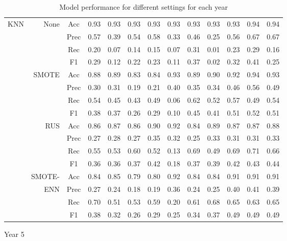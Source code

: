 \begin{table*}
\begin{narrow}{-1cm}{-1cm}
\begin{subtable}[t]{2\columnwidth}
\begin{tabular}{l|r|c|cccccccccc}
        KNN & None & Acc & 0.93 & 0.93 & 0.93 & 0.93 & 0.93 & 0.93 & 0.93 & 0.93 & 0.94 & 0.94 \\
        ~ & ~ & Prec & 0.57 & 0.39 & 0.54 & 0.58 & 0.33 & 0.46 & 0.25 & 0.56 & 0.67 & 0.67 \\
        ~ & ~ & Rec & 0.20 & 0.07 & 0.14 & 0.15 & 0.07 & 0.31 & 0.01 & 0.23 & 0.29 & 0.16 \\
        ~ & ~ & F1 & 0.29 & 0.12 & 0.22 & 0.23 & 0.11 & 0.37 & 0.02 & 0.32 & 0.41 & 0.25 \\
        \cline{2-13}
        ~ & SMOTE & Acc & 0.88 & 0.89 & 0.83 & 0.84 & 0.93 & 0.89 & 0.90 & 0.92 & 0.94 & 0.93 \\
        ~ & ~ & Prec & 0.30 & 0.31 & 0.19 & 0.21 & 0.40 & 0.35 & 0.34 & 0.46 & 0.56 & 0.49 \\
        ~ & ~ & Rec & 0.54 & 0.45 & 0.43 & 0.49 & 0.06 & 0.62 & 0.52 & 0.57 & 0.49 & 0.54 \\
        ~ & ~ & F1 & 0.38 & 0.37 & 0.26 & 0.29 & 0.10 & 0.45 & 0.41 & 0.51 & 0.52 & 0.51 \\
        \cline{2-13}
        ~ & RUS & Acc & 0.86 & 0.87 & 0.86 & 0.90 & 0.92 & 0.84 & 0.89 & 0.87 & 0.87 & 0.88 \\
        ~ & ~ & Prec & 0.27 & 0.28 & 0.27 & 0.35 & 0.32 & 0.25 & 0.33 & 0.31 & 0.31 & 0.33 \\
        ~ & ~ & Rec & 0.55 & 0.53 & 0.60 & 0.52 & 0.13 & 0.69 & 0.49 & 0.69 & 0.71 & 0.66 \\
        ~ & ~ & F1 & 0.36 & 0.36 & 0.37 & 0.42 & 0.18 & 0.37 & 0.39 & 0.42 & 0.43 & 0.44 \\
        \cline{2-13}
        ~ & SMOTE- & Acc & 0.84 & 0.85 & 0.79 & 0.80 & 0.92 & 0.84 & 0.84 & 0.91 & 0.91 & 0.91 \\
        ~ & ENN & Prec & 0.27 & 0.24 & 0.18 & 0.19 & 0.36 & 0.24 & 0.25 & 0.40 & 0.41 & 0.39 \\
        ~ & ~ & Rec & 0.70 & 0.51 & 0.53 & 0.59 & 0.20 & 0.61 & 0.68 & 0.65 & 0.63 & 0.65 \\
        ~ & ~ & F1 & 0.38 & 0.32 & 0.26 & 0.29 & 0.25 & 0.34 & 0.37 & 0.49 & 0.49 & 0.49 \\
         \hline \hline
         
    \end{tabular}
    \caption{ \label{tab::results_y5} \indent Year 5}
    
   
\end{subtable}


\caption{\label{tab::results} Model performance for different settings for each year}
\end{narrow}
\end{table*} 